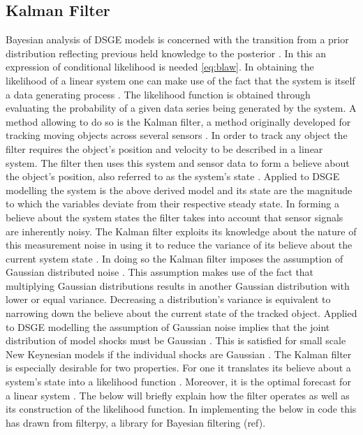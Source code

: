 \documentclass[12pt,a4paper,english]{article} %
\begin{document}
		
	\subsection{Kalman Filter}
	Bayesian analysis of DSGE models is concerned with the transition from a prior distribution reflecting previous held knowledge to the posterior \cite{herbst_bayesian_2016}. In this an expression of conditional likelihood is needed \eqref{eq:blaw}. In obtaining the likelihood of a linear system one can make use of the fact that the system is itself a data generating process \cite{andrews_kalman_2008}. The likelihood function is obtained through evaluating the probability of a given data series being generated by the system. 
	A method allowing to do so is the Kalman filter, a method originally developed for tracking moving objects across several sensors \cite{kalman_new_1960}. In order to track any object the filter requires the object's position and velocity to be described in a linear system. The filter then uses this system and sensor data to form a believe about the object's position, also referred to as the system's state \cite{andrews_kalman_2008}. Applied to DSGE modelling the system is the above derived model and its state are the magnitude to which the variables deviate from their respective steady state.	
	In forming a believe about the system states the filter takes into account that sensor signals are inherently noisy. The Kalman filter exploits its knowledge about the nature of this measurement noise in using it to reduce the variance of its believe about the current system state \cite{andrews_kalman_2008}. In doing so the Kalman filter imposes the assumption of Gaussian distributed noise \cite{kalman_new_1960}. This assumption makes use of the fact that multiplying Gaussian distributions results in another Gaussian distribution with lower or equal variance. Decreasing a distribution's variance is equivalent to narrowing down the believe about the current state of the tracked object. Applied to DSGE modelling the assumption of Gaussian noise implies that the joint distribution of model shocks must be Gaussian \cite{herbst_bayesian_2016}. This is satisfied for small scale New Keynesian models if the individual shocks are Gaussian \cite{herbst_bayesian_2016}. 	
	The Kalman filter is especially desirable for two properties. For one it translates its believe about a system's state into a likelihood function \cite{kalman_new_1960}. Moreover, it is the optimal forecast for a linear system \cite{kalman_new_1960}. The below will briefly explain how the filter operates as well as its construction of the likelihood function. In implementing the below in code this has drawn from filterpy, a library for Bayesian filtering (ref).
	
\end{document}

